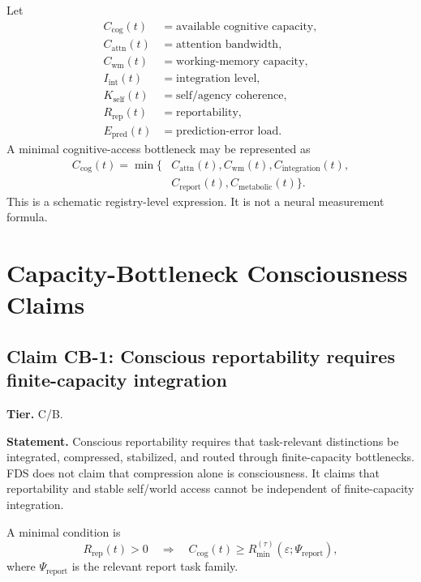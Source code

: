 \documentclass[10pt,a4paper,twocolumn,aps,prl]{revtex4-2}
\theoremstyle{claimstyle}
\theoremstyle{definition}
\newcommand{\FDS}{FDS}
\newcommand{\claimfield}[1]{\noindent\textbf{#1.}}
\newcommand{\Cwm}{C_{\mathrm{wm}}}
\newcommand{\Catt}{C_{\mathrm{attn}}}
\newcommand{\Kself}{K_{\mathrm{self}}}
\newcommand{\Rrep}{R_{\mathrm{rep}}}
\newcommand{\Epred}{E_{\mathrm{pred}}}
\begin{document}
Let
\begin{align}
    C_{\mathrm{cog}}(t) &= \text{available cognitive capacity},\\
    \Catt(t) &= \text{attention bandwidth},\\
    \Cwm(t) &= \text{working-memory capacity},\\
    I_{\mathrm{int}}(t) &= \text{integration level},\\
    \Kself(t) &= \text{self/agency coherence},\\
    \Rrep(t) &= \text{reportability},\\
    \Epred(t) &= \text{prediction-error load}.
\end{align}
A minimal cognitive-access bottleneck may be represented as
\begin{equation}
\begin{aligned}
C_{\mathrm{cog}}(t)=\min\{&\Catt(t),\Cwm(t),C_{\mathrm{integration}}(t),\\
&C_{\mathrm{report}}(t),C_{\mathrm{metabolic}}(t)\}.
\end{aligned}
\end{equation}
This is a schematic registry-level expression. It is not a neural measurement formula.

\section{Capacity-Bottleneck Consciousness Claims}

\subsection{Claim CB-1: Conscious reportability requires finite-capacity integration}

\claimfield{Tier} C/B.

\claimfield{Statement} Conscious reportability requires that task-relevant distinctions be integrated, compressed, stabilized, and routed through finite-capacity bottlenecks. \FDS{} does not claim that compression alone is consciousness. It claims that reportability and stable self/world access cannot be independent of finite-capacity integration.

A minimal condition is
\begin{equation}
\Rrep(t)>0 \quad \Rightarrow \quad C_{\mathrm{cog}}(t) \ge R_{\min}^{(\tau)}(\varepsilon;\Psi_{\mathrm{report}}),
\end{equation}
where $\Psi_{\mathrm{report}}$ is the relevant report task family.
\end{document}

